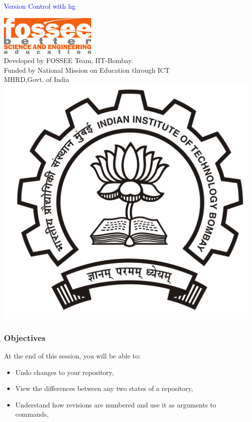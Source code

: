 \documentclass[12pt,compress]{beamer}
\begin{document}
\begin{frame}

\begin{center}
\vspace{12pt}
\textcolor{blue}{\huge Version Control with hg}
\end{center}
\vspace{18pt}
\begin{center}
\vspace{10pt}
\includegraphics[scale=0.95]{../images/fossee-logo.png}\\
\vspace{5pt}
\scriptsize Developed by FOSSEE Team, IIT-Bombay. \\ 
\scriptsize Funded by National Mission on Education through ICT\\
\scriptsize  MHRD,Govt. of India\\
\includegraphics[scale=0.30]{../images/iitb-logo.jpg}\\
\end{center}
\end{frame}

\begin{frame}
  \frametitle{Objectives}
\label{sec-2}
  At the end of this session, you will be able to:
  \begin{itemize}
  \item Undo changes to your repository,
  \item View the differences between any two states of a repository,
  \item Understand how revisions are numbered and use it as arguments to commands,
  \end{itemize}
\end{frame}
\end{document}

